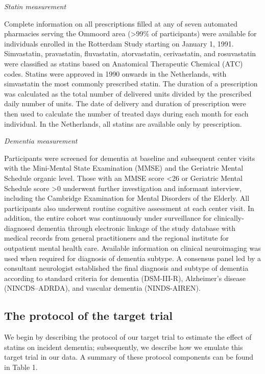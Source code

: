 \documentclass[
]{book}
\begin{document}
\emph{Statin measurement}

Complete information on all prescriptions filled at any of seven automated pharmacies serving the Ommoord area (\textgreater99\% of participants) were available for individuals enrolled in the Rotterdam Study starting on January 1, 1991\autocite{hofman2015}. Simvastatin, pravastatin, fluvastatin, atorvastatin, cerivastatin, and rosuvastatin were classified as statins based on Anatomical Therapeutic Chemical (ATC) codes. Statins were approved in 1990 onwards in the Netherlands, with simvastatin the most commonly prescribed statin\autocite{mantel2002}. The duration of a prescription was calculated as the total number of delivered units divided by the prescribed daily number of units.
The date of delivery and duration of prescription were then used to calculate the number of treated days during each month for each individual. In the Netherlands, all statins are available only by prescription.

\emph{Dementia measurement}

Participants were screened for dementia at baseline and subsequent center visits with the Mini-Mental State Examination (MMSE) and the Geriatric Mental Schedule organic level\autocite{debruijn2015}. Those with an MMSE score \textless26 or Geriatric Mental Schedule score \textgreater0 underwent further investigation and informant interview, including the Cambridge Examination for Mental Disorders of the Elderly. All participants also underwent routine cognitive assessment at each center visit. In addition, the entire cohort was continuously under surveillance for clinically-diagnosed dementia through electronic linkage of the study database with medical records from general practitioners and the regional institute for outpatient mental health care. Available information on clinical neuroimaging was used when required for diagnosis of dementia subtype. A consensus panel led by a consultant neurologist established the final diagnosis and subtype of dementia according to standard criteria for dementia (DSM-III-R), Alzheimer's disease (NINCDS--ADRDA), and vascular dementia (NINDS-AIREN).

\hypertarget{the-protocol-of-the-target-trial}{%
\subsection{The protocol of the target trial}\label{the-protocol-of-the-target-trial}}

We begin by describing the protocol of our target trial to estimate the effect of statins on incident dementia; subsequently, we describe how we emulate this target trial in our data. A summary of these protocol components can be found in Table 1.
\end{document}
